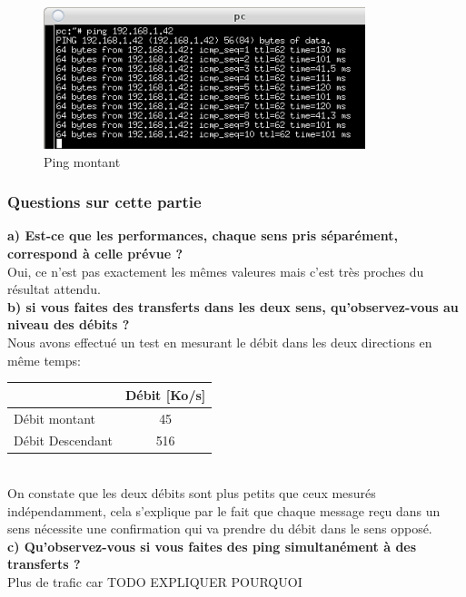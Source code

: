 \documentclass{article}
\begin{document}
\begin{figure}[h]
	\centering
	\includegraphics{./captures/pingmontant.png}
	\caption{Ping montant}
	\label{fig:token-bucket}
\end{figure}





\subsubsection{Questions sur cette partie}
\textbf{a) Est-ce que les performances, chaque sens pris séparément, correspond à celle prévue ?}\\
Oui, ce n'est pas exactement les mêmes valeures mais c'est très proches du résultat attendu.
\\

\textbf{b) si vous faites des transferts dans les deux sens, qu'observez-vous au niveau des débits ?}\\
Nous avons effectué un test en mesurant le débit dans les deux directions en même temps:\\
\begin{tabular}{|l|c|}
  \hline
   & Débit [Ko/s]\\
  \hline
  Débit montant & 45 \\
  Débit Descendant & 516 \\
  \hline
\end{tabular}
\\

On constate que les deux débits sont plus petits que ceux mesurés indépendamment, cela s'explique par le fait que chaque message reçu dans un sens nécessite une confirmation qui va prendre du débit dans le sens opposé.
\\

\textbf{c) Qu'observez-vous si vous faites des ping simultanément à des transferts ?}\\
Plus de trafic car TODO EXPLIQUER POURQUOI
\end{document}

